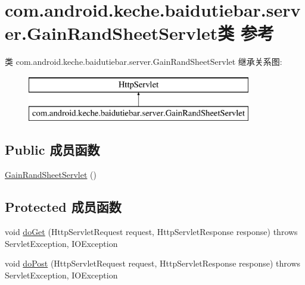 \hypertarget{classcom_1_1android_1_1keche_1_1baidutiebar_1_1server_1_1_gain_rand_sheet_servlet}{}\section{com.\+android.\+keche.\+baidutiebar.\+server.\+Gain\+Rand\+Sheet\+Servlet类 参考}
\label{classcom_1_1android_1_1keche_1_1baidutiebar_1_1server_1_1_gain_rand_sheet_servlet}
类 com.\+android.\+keche.\+baidutiebar.\+server.\+Gain\+Rand\+Sheet\+Servlet 继承关系图\+:\begin{figure}[H]
\begin{center}
\leavevmode
\includegraphics[height=2.000000cm]{classcom_1_1android_1_1keche_1_1baidutiebar_1_1server_1_1_gain_rand_sheet_servlet}
\end{center}
\end{figure}
\subsection*{Public 成员函数}
\begin{DoxyCompactItemize}
\item 
\mbox{\hyperlink{classcom_1_1android_1_1keche_1_1baidutiebar_1_1server_1_1_gain_rand_sheet_servlet_af71856b0ff809efcbf646987f01ad8e4}{Gain\+Rand\+Sheet\+Servlet}} ()
\end{DoxyCompactItemize}
\subsection*{Protected 成员函数}
\begin{DoxyCompactItemize}
\item 
void \mbox{\hyperlink{classcom_1_1android_1_1keche_1_1baidutiebar_1_1server_1_1_gain_rand_sheet_servlet_aac0f9b5813cd367ba330f249078a4441}{do\+Get}} (Http\+Servlet\+Request request, Http\+Servlet\+Response response)  throws Servlet\+Exception, I\+O\+Exception 
\item 
void \mbox{\hyperlink{classcom_1_1android_1_1keche_1_1baidutiebar_1_1server_1_1_gain_rand_sheet_servlet_accb367e2c96ba8ff2c86df33780d324b}{do\+Post}} (Http\+Servlet\+Request request, Http\+Servlet\+Response response)  throws Servlet\+Exception, I\+O\+Exception 
\end{DoxyCompactItemize}


